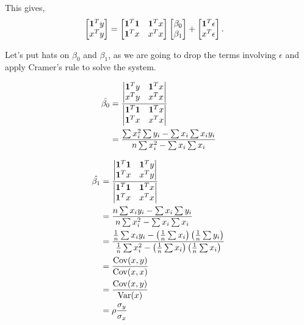 \documentclass{amsart}
\theoremstyle{plain}
\numberwithin{equation}{section}
\begin{document}
This gives,
\begin{align*}
\begin{bmatrix}
{\bf 1}^Ty\\
x^Ty
\end{bmatrix}
&= 
\begin{bmatrix}
{\bf 1}^T{\bf 1} & {\bf 1}^Tx\\
{\bf 1}^Tx & x^Tx
\end{bmatrix}
\begin{bmatrix}
\beta_0\\
\beta_1
\end{bmatrix} + 
\begin{bmatrix}
{\bf 1}^T \epsilon\\
x^T\epsilon
\end{bmatrix}.
\end{align*}

Let's put hats on $\beta_0$ and 
$\beta_1$, as we are going to drop the 
terms involving $\epsilon$ and apply 
Cramer's rule to solve the system.

\begin{align*}
\hat{\beta_0} &= \frac{
\left|
\begin{matrix}
{\bf 1}^Ty & {\bf 1}^Tx\\
x^Ty & x^Tx
\end{matrix}
\right|}
{
\left|
\begin{matrix}
{\bf 1}^T{\bf 1} & {\bf 1}^Tx\\
{\bf 1}^Tx & x^Tx
\end{matrix}
\right|}\\
&=\frac{\sum{x_i^2}\sum{y_i}-\sum{x_i}\sum{x_i y_i}}{n\sum{x_i^2}-\sum{x_i}\sum{x_i}}
\end{align*}

\begin{align*}
\hat{\beta_1} &= \frac{
\left|
\begin{matrix}
{\bf 1}^T{\bf 1} & {\bf 1}^Ty\\
{\bf 1}^Tx & x^Ty
\end{matrix}
\right|}
{
\left|
\begin{matrix}
{\bf 1}^T{\bf 1} & {\bf 1}^Tx\\
{\bf 1}^Tx & x^Tx
\end{matrix}
\right|}\\ 
& = \frac{n \sum{x_i y_i} - \sum{x_i}\sum{y_i}}
{n\sum{x_i^2}-\sum{x_i}\sum{x_i}}\\
& = \frac{ \frac{1}{n}\sum{x_i y_i} - 
\left(\frac{1}{n}\sum{x_i}\right)\left(\frac{1}{n}\sum{y_i}\right)}
{\frac{1}{n}\sum{x_i^2}-
\left(\frac{1}{n}\sum{x_i}\right)\left(\frac{1}{n}\sum{x_i}\right)}\\
& = \frac{\mathrm{Cov}(x, y)}{\mathrm{Cov}(x, x)}\\
& = \frac{\mathrm{Cov}(x, y)}{\mathrm{Var}(x)}\\
& = \rho \frac{\sigma_y}{\sigma_x}
\end{align*}
\end{document}
